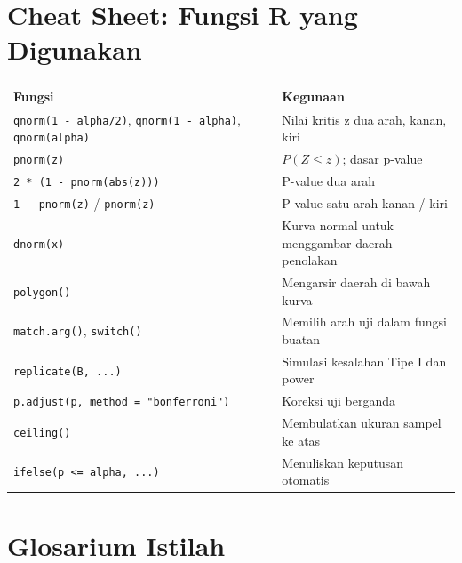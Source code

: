 \documentclass[
  indonesian,
  letterpaper,
]{book}
\newcounter{none} %
\begin{document}
\section{Cheat Sheet: Fungsi R yang
Digunakan}\label{cheat-sheet-fungsi-r-yang-digunakan-1}

{\def\LTcaptype{none} %
\begin{longtable}[]{@{}
  >{\raggedright\arraybackslash}p{}
  >{\raggedright\arraybackslash}p{}@{}}
\toprule\noalign{}
\begin{minipage}[b]{\linewidth}\raggedright
Fungsi
\end{minipage} & \begin{minipage}[b]{\linewidth}\raggedright
Kegunaan
\end{minipage} \\
\midrule\noalign{}
\endhead
\bottomrule\noalign{}
\endlastfoot
\texttt{qnorm(1\ -\ alpha/2)}, \texttt{qnorm(1\ -\ alpha)},
\texttt{qnorm(alpha)} & Nilai kritis z dua arah, kanan, kiri \\
\texttt{pnorm(z)} & \(P(Z \le z)\); dasar p-value \\
\texttt{2\ *\ (1\ -\ pnorm(abs(z)))} & P-value dua arah \\
\texttt{1\ -\ pnorm(z)} / \texttt{pnorm(z)} & P-value satu arah kanan /
kiri \\
\texttt{dnorm(x)} & Kurva normal untuk menggambar daerah penolakan \\
\texttt{polygon()} & Mengarsir daerah di bawah kurva \\
\texttt{match.arg()}, \texttt{switch()} & Memilih arah uji dalam fungsi
buatan \\
\texttt{replicate(B,\ ...)} & Simulasi kesalahan Tipe I dan power \\
\texttt{p.adjust(p,\ method\ =\ "bonferroni")} & Koreksi uji berganda \\
\texttt{ceiling()} & Membulatkan ukuran sampel ke atas \\
\texttt{ifelse(p\ \textless{}=\ alpha,\ ...)} & Menuliskan keputusan
otomatis \\
\end{longtable}
}

\section{Glosarium Istilah}\label{glosarium-istilah-1}
\end{document}
